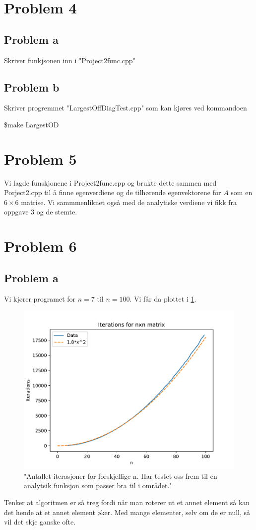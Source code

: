 \documentclass[reprint,english,notitlepage]{revtex4-1}  %
\begin{document}
\section*{Problem 4}

\subsection*{Problem a}

Skriver funkjsonen inn i "Project2func.cpp"

\subsection*{Problem b}

Skriver progremmet "LargestOffDiagTest.cpp" som kan kjøres ved kommandoen

\$make LargestOD
\section*{Problem 5}
Vi lagde funskjonene i Project2func.cpp og brukte dette sammen med Porject2.cpp til å finne egenverdiene og de tilhørende egenvektorene for $A$ som  en $6\times6$ matrise. Vi sammmenliknet også med de analytiske verdiene vi fikk fra oppgave 3 og de stemte.
\section*{Problem 6}
\subsection*{Problem a}
Vi kjører programet for $n = 7$ til $n = 100$. Vi får da plottet i \ref{plotit}.

\begin{figure}
	\centering
	\includegraphics[scale=0.6]{Images/Iterations.pdf}
	\caption{"Antallet iterasjoner for forskjellige n. Har testet oss frem til en analytsik funksjon som passer bra til i området."}
	\label{plotit}
\end{figure}
Tenker at algoritmen er så treg fordi når man roterer ut et annet element så kan det hende at et annet element øker. Med mange elementer, selv om de er null, så vil det skje ganske ofte.
\end{document}
